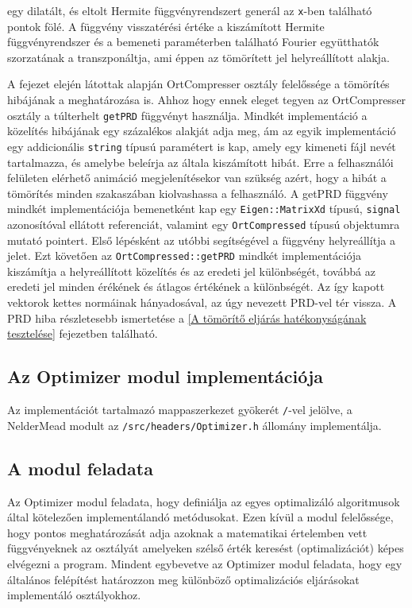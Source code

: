 \documentclass[oneside,titlepage,12pt,a4paper]{report}
\begin{document}
 egy dilatált, és eltolt Hermite függvényrendszert generál az \texttt{x}-ben található pontok fölé. A függvény visszatérési értéke a kiszámított Hermite függvényrendszer és a bemeneti paraméterben található Fourier együtthatók szorzatának a transzponáltja, ami éppen az tömörített jel helyreállított alakja.
\par A fejezet elején látottak alapján OrtCompresser osztály felelőssége a tömörítés hibájának a meghatározása is. Ahhoz hogy ennek eleget tegyen az OrtCompresser osztály a túlterhelt \texttt{getPRD} függvényt használja. Mindkét implementáció a közelítés hibájának egy százalékos alakját adja meg, ám az egyik implementáció egy addicionális \texttt{string} típusú paramétert is kap, amely egy kimeneti fájl nevét tartalmazza, és amelybe beleírja az általa kiszámított hibát. Erre a felhasználói felületen elérhető animáció megjelenítésekor van szükség azért, hogy a hibát a tömörítés minden szakaszában kiolvashassa a felhasználó. A getPRD függvény mindkét implementációja bemenetként kap egy \texttt{Eigen::MatrixXd} típusú, \texttt{signal} azonosítóval ellátott referenciát,  valamint egy \texttt{OrtCompressed} típusú objektumra mutató pointert. Első lépésként az utóbbi segítségével a függvény helyreállítja a jelet. Ezt követően az \texttt{OrtCompressed::getPRD} mindkét implementációja kiszámítja a helyreállított közelítés és az eredeti jel különbségét, továbbá az eredeti jel minden érékének és átlagos értékének a különbségét. Az így kapott vektorok kettes normáinak hányadosával, az úgy nevezett PRD-vel tér vissza. A PRD hiba részletesebb ismertetése a \ref{A tömörítő eljárás hatékonyságának tesztelése} fejezetben található.   

\subsection{Az Optimizer modul implementációja}

Az implementációt tartalmazó mappaszerkezet gyökerét \texttt{/}-vel jelölve, a NelderMead modult  az \texttt{/src/headers/Optimizer.h} állomány implementálja.

\subsection*{A modul feladata}

\par Az Optimizer modul feladata, hogy definiálja az egyes optimalizáló algoritmusok által kötelezően implementálandó metódusokat. Ezen kívül a modul felelőssége, hogy pontos meghatározását adja azoknak a matematikai értelemben vett függvényeknek az osztályát amelyeken szélső érték keresést (optimalizációt) képes elvégezni a program. Mindent egybevetve az Optimizer modul feladata, hogy egy általános felépítést határozzon meg különböző optimalizációs eljárásokat implementáló osztályokhoz. 
\end{document}
